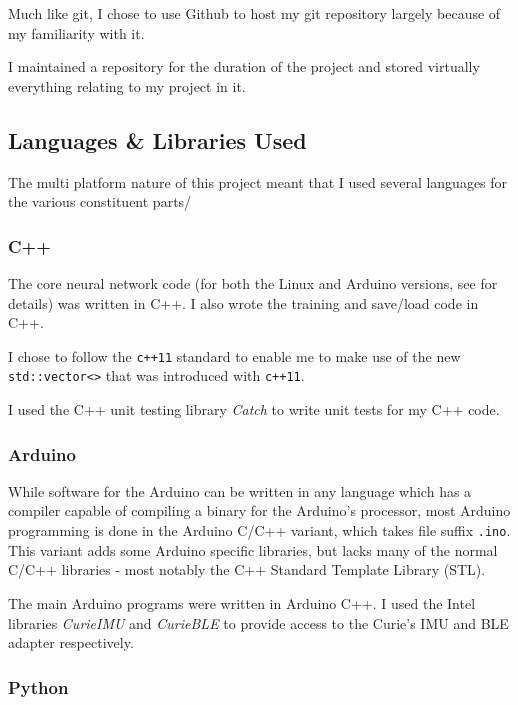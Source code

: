 \documentclass[a4paper]{article}
\begin{document}
Much like git, I chose to use Github\cite{ppref2} to host my git repository largely because of my familiarity with it. 

I maintained a repository\cite{ppref3} for the duration of the project and stored virtually everything relating to my project in it.

\subsection{Languages \& Libraries Used}%

The multi platform nature of this project meant that I used several languages for the various constituent parts/

\subsubsection{C++}

The core neural network code (for both the Linux and Arduino versions, see  for details) was written in C++\cite{ppref4}. I also wrote the training and save/load code in C++.

I chose to follow the \lstinline{c++11}\cite{ppref5} standard to enable me to make use of the new \lstinline{std::vector<>} that was introduced with \lstinline{c++11}.

I used the C++ unit testing library \textit{Catch}\cite{ppref6} to write unit tests for my C++ code.

\subsubsection{Arduino}

While software for the Arduino can be written in any language which has a compiler capable of compiling a binary for the Arduino's processor, most Arduino programming is done in the Arduino C/C++ variant\cite{ppref7}, which takes file suffix \lstinline{.ino}. This variant adds some Arduino specific libraries\cite{ppref8}, but lacks many of the normal C/C++ libraries - most notably the C++ Standard Template Library (STL).\cite{ppref9}

The main Arduino programs were written in Arduino C++. I used the Intel libraries \textit{CurieIMU}\cite{ppref10} and \textit{CurieBLE}\cite{ppref11} to provide access to the Curie's IMU and BLE adapter respectively.

\subsubsection{Python}
\end{document}
